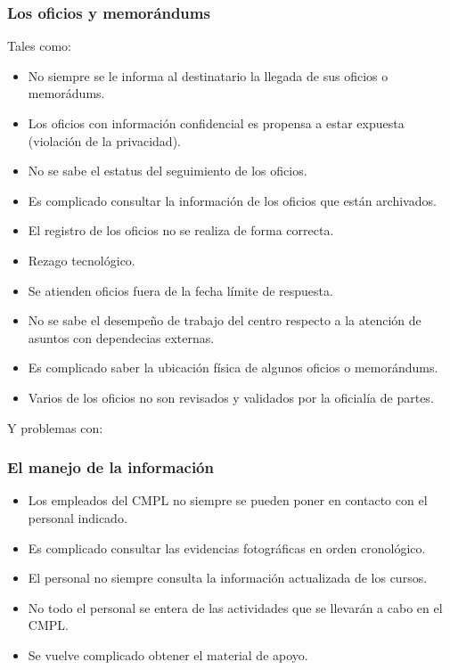 \subsubsection{Los oficios y memorándums}

Tales como: 
\begin{itemize}
	\item No siempre se le informa al destinatario la llegada de sus oficios o memorádums.
	\item Los oficios con información confidencial es propensa a estar expuesta (violación de la privacidad).
	\item No se sabe el estatus del seguimiento de los oficios.
	\item Es complicado consultar la información de los oficios que están archivados.
	\item El registro de los oficios no se realiza de forma correcta.
	\item Rezago tecnológico.
	\item Se atienden oficios fuera de la fecha límite de respuesta.
	\item No se sabe el desempeño de trabajo del centro respecto a la atención de asuntos con dependecias externas.

	\item Es complicado saber la ubicación física de algunos oficios o memorándums. %
	\item Varios de los oficios no son revisados y validados por la oficialía de partes.
\end{itemize}
Y problemas con: 

		\subsubsection{El manejo de la información}
\begin{itemize}
	
	\item Los empleados del CMPL no siempre se pueden poner en contacto con el personal indicado.		
	\item Es complicado consultar las evidencias fotográficas en orden cronológico.
	\item El personal no siempre consulta la información actualizada de los cursos.
	\item No todo el personal se entera de las actividades que se llevarán a cabo en el CMPL.
	\item Se vuelve complicado obtener el material de apoyo.		
\end{itemize}

